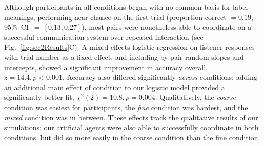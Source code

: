 Although participants in all conditions began with no common basis for label meanings, performing near chance on the first trial (proportion correct $= 0.19$, 95\%~CI~$=~[0.13, 0.27]$), most pairs were nonetheless able to coordinate on a successful communication system over repeated interaction (see Fig.\ \ref{fig:sec2Results}C). 
A mixed-effects logistic regression on listener responses with trial number as a fixed effect, and including by-pair random slopes and intercepts, showed a significant improvement in accuracy overall, $z = 14.4, p < 0.001$. 
Accuracy also differed significantly \emph{across} conditions: adding an additional main effect of condition to our logistic model provided a significantly better fit, $\chi^2(2) = 10.8, p = 0.004$. 
Qualitatively, the \emph{coarse} condition was easiest for participants, the \emph{fine} condition was hardest, and the \emph{mixed} condition was in between.
These effects track the qualitative results of our simulations: our artificial agents were also able to successfully coordinate in both conditions, but did so more easily in the coarse condition than the fine condition. 

%
%

